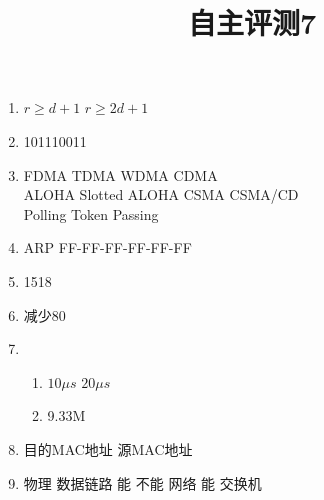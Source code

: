 \documentclass[11pt]{article}
\title{自主评测7}
\date{}
\author{}
\begin{document}
\maketitle

\begin{enumerate}
    \renewcommand{\labelenumii}{(\arabic{enumii})}
    \item $r \geq d + 1$ \quad $r \geq 2d + 1$
    \item 101110011
    \item FDMA \quad TDMA \quad WDMA \quad CDMA \\ 
          ALOHA \quad Slotted ALOHA \quad CSMA \quad CSMA/CD \\
          Polling \quad Token Passing
    \item ARP \quad FF-FF-FF-FF-FF-FF
    \item 1518    
    \item 减少80
    \item
        \begin{enumerate}
            \item $10 \mu s$ \quad $20 \mu s$
            \item 9.33M
        \end{enumerate}
    \item 目的MAC地址 \quad 源MAC地址
    \item 物理 \quad 数据链路 \quad 能 \quad 不能 \quad 网络 \quad 能 \quad 交换机
\end{enumerate}
\end{document}
